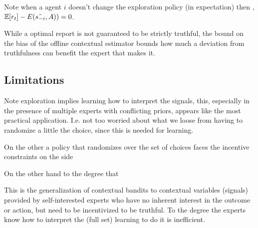 Note when a agent $i$ doesn't change the exploration policy (in expectation) then , $ \operatorname*{\mathbb E}[r_t] -  E(\hat{s_{-i}},A)) =0  $.

While a optimal report is not guaranteed to be strictly truthful, the bound on the bias of the offline contextual estimator bounds how much a deviation from truthfulness can benefit the expert that makes it.






\subsection{Limitations}


Note exploration implies learning how to interpret the signals, this, especially in the presence of multiple experts with conflicting priors, appears like the most practical application. I.e. not too worried about what we loose from having to randomize a little the choice, since this is needed for learning. 

On the other a policy that randomizes over the set of choices faces the incentive constraints on the side 

On the other hand to the degree that 


This is the generalization of contextual bandits to contextual variables (signals) provided by self-interested experts who have no inherent interest in the outcome or action, but need to be incentivized to be truthful. 
To the degree the experts know how to interpret the (full set) learning to do it is inefficient. 










